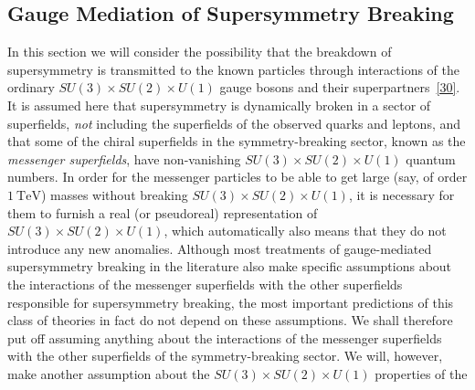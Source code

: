 
\subsection{Gauge Mediation of Supersymmetry Breaking}

In this section we will consider the possibility that the breakdown of
supersymmetry is transmitted to the known particles through interactions
of the ordinary \(SU(3)\times SU(2)\times U(1)\) gauge
bosons and their superpartners~\hyperref[ch28-ref-30]{[30]}. It is assumed
here that supersymmetry is dynamically broken in a sector of superfields,
\emph{not} including the superfields of the observed quarks and leptons,
and that some of the chiral superfields in the symmetry-breaking sector,
known as the \emph{messenger superfields}, have non-vanishing
\(SU(3)\times SU(2)\times U(1)\) quantum numbers. In order
for the messenger particles to be able to get large (say, of order
\(1\ \mathrm{TeV}\)) masses without breaking
\(SU(3)\times SU(2)\times U(1)\), it is necessary for them
to furnish a real (or pseudoreal) representation of
\(SU(3)\times SU(2)\times U(1)\), which automatically also
means that they do not introduce any new anomalies. Although most
treatments of gauge-mediated supersymmetry breaking in the literature also
make specific assumptions about the interactions of the messenger
superfields with the other superfields responsible for supersymmetry
breaking, the most important predictions of this class of theories in fact
do not depend on these assumptions. We shall therefore put off assuming
anything about the interactions of the messenger superfields with the other
superfields of the symmetry-breaking sector. We will, however, make another
assumption about the
\(SU(3)\times SU(2)\times U(1)\) properties of the


